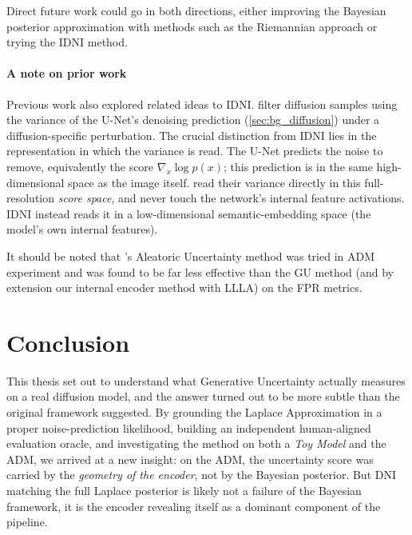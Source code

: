 Direct future work could go in both directions, either improving the Bayesian posterior approximation with methods such as the Riemannian approach \parencite{gegenfurtner_reducing_2026} or trying the \acs{IDNI} method.



\paragraph{A note on prior work}

Previous work also explored related ideas to \acs{IDNI}.
\cite{vita_diffusion_2024} filter diffusion samples using the variance of the U-Net's denoising prediction (\autoref{sec:bg_diffusion}) under a diffusion-specific perturbation. The crucial distinction from \acs{IDNI} lies in the representation in which the variance is read. The U-Net predicts the noise to remove, equivalently the score $\nabla_x \log p(x)$; this prediction is in the same high-dimensional space as the image itself. \cite{vita_diffusion_2024} read their variance directly in this full-resolution \textit{score space}, and never touch the network's internal feature activations. \acs{IDNI} instead reads it in a low-dimensional semantic-embedding space (the model's own internal features).

It should be noted that \cite{vita_diffusion_2024}'s Aleatoric Uncertainty method was tried in \cite{jazbec_generative_2025} \acs{ADM} experiment and was found to be far less effective than the \acs{GU} method (and by extension our internal encoder method with \acs{LLLA}) on the \acs{FPR} metrics.


\section{Conclusion}

This thesis set out to understand what Generative Uncertainty actually measures on a real diffusion model, and the answer turned out to be more subtle than the original framework suggested. By grounding the Laplace Approximation in a proper noise-prediction likelihood, building an independent human-aligned evaluation oracle, and investigating the method on both a \textit{Toy Model} and the \acs{ADM}, we arrived at a new insight: on the \acs{ADM}, the uncertainty score was carried by the \textit{geometry of the encoder}, not by the Bayesian posterior. But \acs{DNI} matching the full Laplace posterior is likely not a failure of the Bayesian framework, it is the encoder revealing itself as a dominant component of the pipeline.

